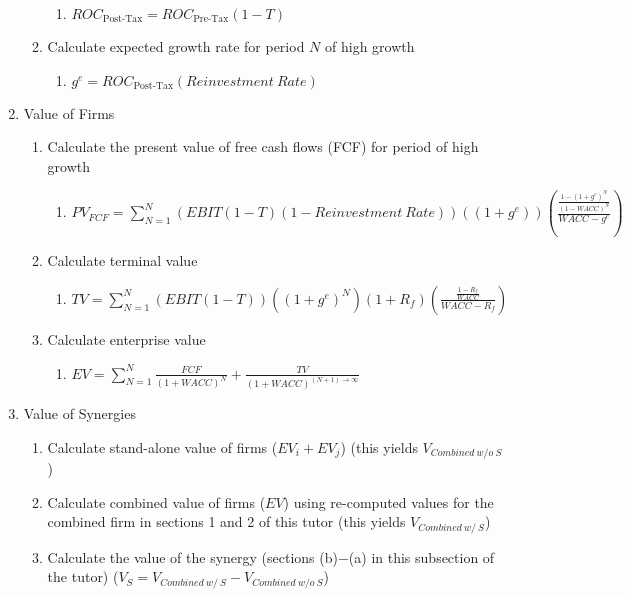 \documentclass[11pt, english]{article}
\begin{document}
\begin{enumerate}
\begin{enumerate}
\begin{enumerate}
				\item $ROC_{\textrm{Post-Tax}}=ROC_{\textrm{Pre-Tax}}(1-T)$
			\end{enumerate}
			\item Calculate expected growth rate for period $N$ of high growth
			\begin{enumerate}
				\item $g^e=ROC_{\textrm{Post-Tax}}(Reinvestment\ Rate)$
			\end{enumerate}
		\end{enumerate}
		\item Value of Firms
		\begin{enumerate}
			\item Calculate the present value of free cash flows (FCF) for period of high growth 
			\begin{enumerate}
				\item $PV_{FCF}=\sum_{N=1}^N(EBIT(1-T)(1-Reinvestment\ Rate))((1+g^e))\left(\frac{\frac{1-(1+g^e)^N}{(1-WACC)^N}}{WACC-g^e}\right)$
			\end{enumerate}
			\item Calculate terminal value
			\begin{enumerate}
				\item $TV=\sum_{N=1}^N(EBIT(1-T))((1+g^e)^N)(1+R_f)\left(\frac{\frac{1-R_f}{WACC}}{WACC-R_f}\right)$
			\end{enumerate}
			\item Calculate enterprise value
			\begin{enumerate}
				\item $EV=\sum_{N=1}^N\frac{FCF}{(1+WACC)^N}+\frac{TV}{(1+WACC)^{(N+1)\longrightarrow\infty}}$
			\end{enumerate}
		\end{enumerate}
		\item Value of Synergies
		\begin{enumerate}
			\item Calculate stand-alone value of firms ($EV_i+EV_j$) (this yields $V_{Combined\ w/o\ S}$)
			\item Calculate combined value of firms ($EV$) using re-computed values for the combined firm in sections 1 and 2 of this tutor (this yields $V_{Combined\ w/\ S}$)
			\item Calculate the value of the synergy (sections (b)$-$(a) in this subsection of the tutor) ($V_S=V_{Combined\ w/\ S}-V_{Combined\ w/o\ S}$)
		\end{enumerate}
	\end{enumerate}
\end{document}

